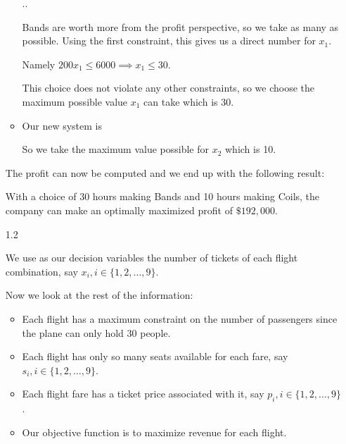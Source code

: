 \documentclass[12pt,letterpaper]{article}
\begin{document}
\begin{enumerate}
\begin{itemize}
          \sysdelim..

          Bands are worth more from the profit perspective, so we take as many as possible.
          Using the first constraint, this gives us a direct number for $x_1$.

          Namely $200 x_1 \leq 6000 \implies x_1 \leq 30$.

          This choice does not violate any other constraints,
          so we choose the maximum possible value $x_1$ can take which is 30.

        \item
          Our new system is


          So we take the maximum value possible for $x_2$ which is 10.
      \end{itemize}

      The profit can now be computed and we end up with the following result:

      With a choice of 30 hours making Bands and 10 hours making Coils,
      the company can make an optimally maximized profit of $\$192,000$.

    \item [1.2]

      We use as our decision variables the number of tickets of each flight combination, say $x_i, i \in \{1, 2, \dots, 9\}$.

      Now we look at the rest of the information:

      \begin{itemize}
        \item
          Each flight has a maximum constraint on the number of passengers since the plane can only hold 30 people.

        \item
          Each flight has only so many seats available for each fare,
          say $s_i, i \in \{1, 2, \dots, 9\}$.

        \item
          Each flight fare has a ticket price associated with it,
          say $p_i, i \in \{1, 2, \dots, 9\}$.

        \item
          Our objective function is to maximize revenue for each flight.
      \end{itemize}


\end{enumerate}
\end{document}
